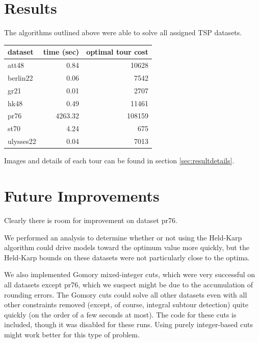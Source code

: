 \documentclass{article}
\begin{document}
\section{Results}
\begin{flushleft}

The algorithms outlined above
were able to solve all assigned TSP datasets.

\begin{center}
\begin{tabular}{ l r r }
  dataset & time (sec) & optimal tour cost \\
  \hline
  att48 &     0.84 &  10628 \\
  berlin22 &  0.06 &   7542 \\
  gr21 &      0.01 &   2707 \\
  hk48 &      0.49 &  11461 \\
  pr76 &   4263.32 & 108159 \\
  st70 &      4.24 &    675 \\
  ulysses22 & 0.04 &   7013
\end{tabular}
\end{center}

Images and details of each tour
can be found in section \ref{sec:resultdetails}.

\end{flushleft}

\section{Future Improvements}

Clearly there is room for improvement on dataset pr76.

We performed an analysis to determine whether or not
using the Held-Karp algorithm could drive models
toward the optimum value more quickly,
but the Held-Karp bounds on these datasets
were not particularly close to the optima.

We also implemented Gomory mixed-integer cuts,
which were very successful on all datasets
except pr76, which we suspect might be due
to the accumulation of rounding errors.
The Gomory cuts could solve all other datasets
even with all other constraints removed
(except, of course, integral subtour detection)
quite quickly (on the order of a few seconds at most).
The code for these cuts is included,
though it was disabled for these runs.
Using purely integer-based cuts might work better
for this type of problem.
\end{document}
